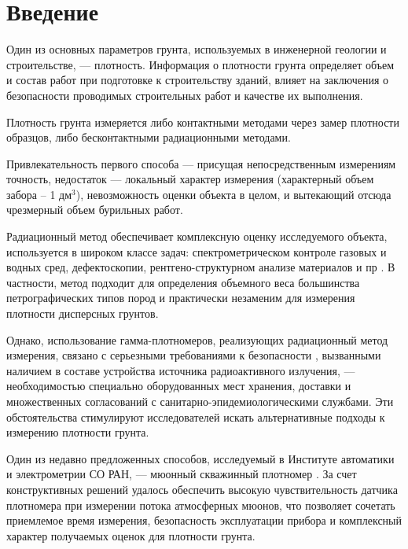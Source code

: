 \chapter*{Введение}							%

Один из основных параметров грунта, используемых в инженерной геологии и строительстве, ---
плотность. Информация о плотности грунта 
определяет объем и состав работ при подготовке к строительству зданий, влияет на заключения о 
безопасности проводимых строительных работ и качестве их выполнения\cite{gost5180, souzdornii}. 

Плотность грунта измеряется либо контактными методами через замер плотности образцов, 
либо бесконтактными радиационными методами.

Привлекательность первого способа --- присущая непосредственным измерениям точность, недостаток ---
локальный характер измерения (характерный объем забора – 1 дм$^{3}$), невозможность оценки объекта в целом,
и вытекающий отсюда чрезмерный объем бурильных работ.

Радиационный метод обеспечивает комплексную оценку исследуемого объекта, используется в широком классе задач:
спектрометрическом контроле газовых и водных сред, дефектоскопии, рентгено-структурном анализе материалов и пр \cite{gammaquant}. 
В частности, метод подходит для определения объемного веса большинства петрографических типов пород и практически 
незаменим для измерения плотности дисперсных грунтов. 

Однако, использование гамма-плотномеров, реализующих радиационный метод измерения, связано с серьезными требованиями 
к безопасности \cite{gost23061}, вызванными наличием в составе устройства источника радиоактивного излучения, --- необходимостью 
специально оборудованных мест хранения, доставки и множественных согласований с санитарно-эпидемиологическими службами. 
Эти обстоятельства стимулируют исследователей искать альтернативные подходы к измерению плотности грунта. 

Один из недавно предложенных способов, исследуемый в Институте автоматики и электрометрии СО РАН, ---
мюонный скважинный плотномер \cite{patentdensitometer}. За счет конструктивных решений удалось обеспечить высокую чувствительность 
датчика плотномера при измерении потока атмосферных мюонов, что позволяет сочетать приемлемое время измерения, 
безопасность эксплуатации прибора и комплексный характер получаемых оценок для плотности грунта.

